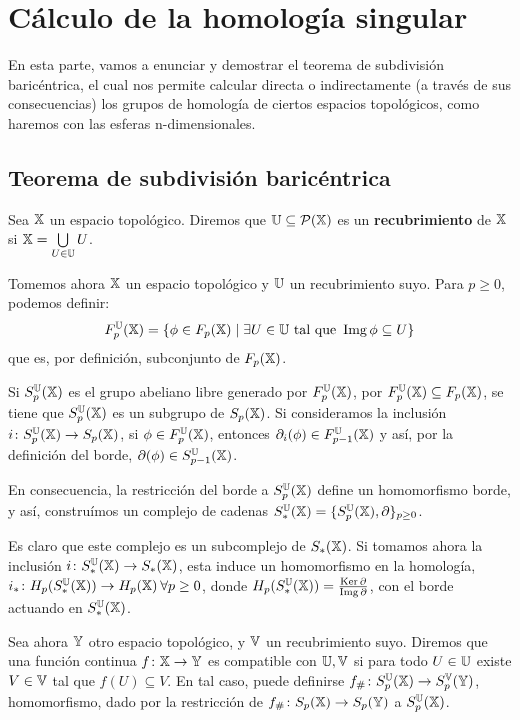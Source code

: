\chapter{Cálculo de la homología singular}\label{ch:calculoI}

En esta parte, vamos a enunciar y demostrar el teorema de subdivisión baricéntrica,
el cual nos permite calcular directa o indirectamente (a través de sus consecuencias)
los grupos de homología de ciertos espacios topológicos, como haremos con las esferas
n-dimensionales.

\section{Teorema de subdivisión baricéntrica}

\begin{definition}
  Sea ${\mathbb X}$ un espacio topológico. Diremos que ${\mathbb U} \subseteq \mathcal P({\mathbb X})$ es un \textbf{recubrimiento} de ${\mathbb X}$ si ${\mathbb X} = \bigcup\limits_{U \in {\mathbb U}} U$.
\end{definition}

Tomemos ahora ${\mathbb X}$ un espacio topológico y ${\mathbb U}$ un recubrimiento suyo. Para $ p \geq 0$, podemos definir:
\[ F_p^{\mathbb U}({\mathbb X}) = \{\phi \in F_p({\mathbb X}) \mid \exists U \in {\mathbb U} \text{ tal que } \operatorname{Img} \phi \subseteq U\} \]
que es, por definición, subconjunto de $F_p({\mathbb X})$.

Si $S_p^{\mathbb U}({\mathbb X})$ es el grupo abeliano libre generado por $F_p^{\mathbb U}({\mathbb X})$, por $F_p^{\mathbb U}({\mathbb X}) \subseteq F_p({\mathbb X})$, se tiene
que $S_p^{\mathbb U}({\mathbb X})$ es un subgrupo de $S_p({\mathbb X})$. Si consideramos la inclusión $i \colon S_p^{\mathbb U}({\mathbb X}) \to S_p({\mathbb X})$, si
$\phi \in F_p^{\mathbb U}({\mathbb X})$, entonces $\partial_i(\phi) \in F_{p-1}^{\mathbb U}({\mathbb X})$ y así, por la definición del borde, $\partial(\phi) \in S_{p-1}^{\mathbb U}({\mathbb X})$.

En consecuencia, la restricción del borde a $S_p^{\mathbb U}({\mathbb X})$ define un homomorfismo borde, y así, construímos un complejo
de cadenas $S_*^{\mathbb U}({\mathbb X}) = \{S_p^{\mathbb U}({\mathbb X}), \partial\}_{p \geq 0}$.

Es claro que este complejo es un subcomplejo de $S_*({\mathbb X})$. Si tomamos ahora la inclusión $i \colon S_*^{\mathbb U}({\mathbb X}) \to S_*({\mathbb X})$,
esta induce un homomorfismo en la homología, $i_* \colon H_p(S_*^{\mathbb U}({\mathbb X})) \to H_p({\mathbb X}) \hspace{0.2em} \forall p \geq 0$, donde
$H_p(S_*^{\mathbb U}({\mathbb X})) = \frac{\operatorname{Ker} \partial}{\operatorname{Img} \partial}$, con el borde actuando en $S_*^{\mathbb U}({\mathbb X})$.

Sea ahora ${\mathbb Y}$ otro espacio topológico, y ${\mathbb V}$ un recubrimiento suyo. Diremos que una función continua $f \colon {\mathbb X} \to {\mathbb Y}$ es compatible
con ${\mathbb U}, {\mathbb V}$ si para todo $U \in {\mathbb U}$ existe $V \in {\mathbb V}$ tal que $f(U) \subseteq V$. En tal caso, puede definirse
$f_\# \colon S_p^{\mathbb U}({\mathbb X}) \to S_p^{\mathbb V}({\mathbb Y})$, homomorfismo, dado por la restricción de $f_\# \colon S_{p}({\mathbb X}) \to S_{p}({\mathbb Y})$ a $S_p^{\mathbb U}({\mathbb X})$.

